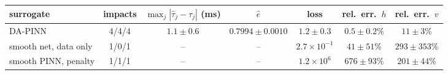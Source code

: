 \begin{tabular}{lcccccc}\hline
surrogate & impacts & $\max_j|\hat\tau_j-\tau_j|$ (ms) & $\hat e$ & loss & rel.\ err.\ $h$ & rel.\ err.\ $v$ \\
\hline
DA-PINN & 4/4/4 & $1.1 \pm 0.6$ & $0.7994 \pm 0.0010$ & $1.2 \pm 0.3$ & $0.5 \pm 0.2$\% & $11 \pm 3$\% \\
smooth net, data only & 1/0/1 & -- & -- & $2.7{\times}10^{-1}$ & $41 \pm 51$\% & $293 \pm 353$\% \\
smooth PINN, penalty & 1/1/1 & -- & -- & $1.2{\times}10^{6}$ & $676 \pm 93$\% & $201 \pm 44$\% \\
\hline\end{tabular}
